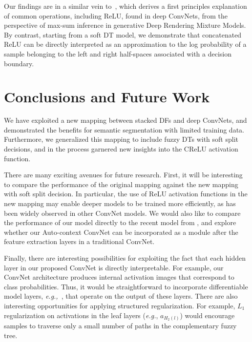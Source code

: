 \documentclass[twocolumn]{svjour3}
\begin{document}
Our findings are in a similar vein to~\cite{Patel}, which derives a first principles explanation of common operations, including ReLU, found in deep ConvNets, from the perspective of max-sum inference in generative Deep Rendering Mixture Models.
By contrast, starting from a soft DT model, we demonstrate that concatenated ReLU can be directly interpreted as an approximation to the log probability of a sample belonging to the left and right half-spaces associated with a decision boundary.


%
\section{Conclusions and Future Work}

We have exploited a new mapping between stacked DFs and deep ConvNets, and demonstrated the benefits for semantic segmentation with limited training data.
Furthermore, we generalized this mapping to include fuzzy DTs with soft split decisions, and in the process garnered new insights into the CReLU activation function.

There are many exciting avenues for future research.
First, it will be interesting to compare the performance of the original mapping against the new mapping with soft split decision.
In particular, the use of ReLU activation functions in the new mapping may enable deeper models to be trained more efficiently, as has been widely observed in other ConvNet models.
We would also like to compare the performance of our model directly to the recent model from \cite{DeepNDFs}, and explore whether our Auto-context ConvNet can be incorporated as a module after the feature extraction layers in a traditional ConvNet.

Finally, there are interesting possibilities for exploiting the fact that each hidden layer in our proposed ConvNet is directly interpretable.
For example, our ConvNet architecture produces internal activation images that correspond to class probabilities.
Thus, it would be straightforward to incorporate differentiable model layers, \emph{e.g.,}~\cite{Girshick:2014um}, that operate on the output of these layers.
There are also interesting opportunities for applying structured regularization.  For example, $L_1$ regularization on activations in the leaf layers (\textit{e.g.}, $a_{H_2(l)}$) would encourage samples to traverse only a small number of paths in the complementary fuzzy tree.

      
   
\end{document}
